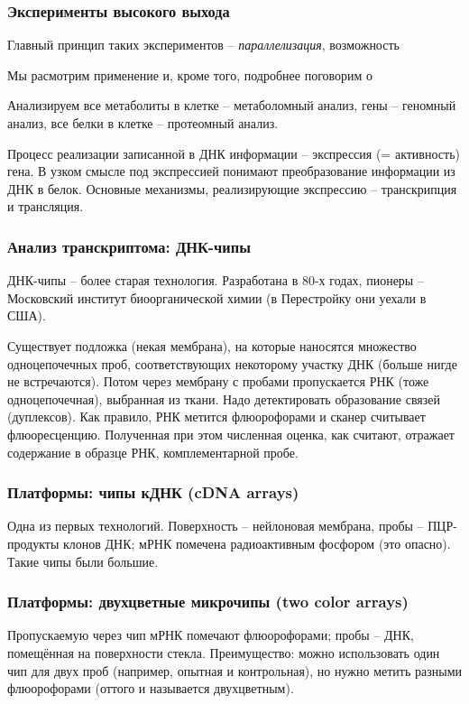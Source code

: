 \documentclass[main.tex]{subfiles}
\begin{document}
\subsubsection{Эксперименты высокого выхода}

Главный принцип таких экспериментов -- \emph{параллелизация}, возможность

Мы расмотрим применение и, кроме того, подробнее поговорим о %

Анализируем все метаболиты в клетке -- метаболомный анализ, гены -- геномный анализ, все белки в клетке -- протеомный анализ.

Процесс реализации записанной в ДНК информации -- экспрессия (= активность) гена. В узком смысле под экспрессией понимают преобразование информации из ДНК в белок. Основные механизмы, реализирующие экспрессию -- транскрипция и трансляция.

\subsubsection{Анализ транскриптома: ДНК-чипы}
ДНК-чипы -- более старая технология. Разработана в 80-х годах, пионеры -- Московский институт биоорганической химии (в Перестройку они уехали в США).

Существует подложка (некая мембрана), на которые наносятся множество одноцепочечных проб, соответствующих некоторому участку ДНК (больше нигде не встречаются).
Потом через мембрану с пробами пропускается РНК (тоже одноцепочечная), выбранная из ткани.
Надо детектировать образование связей (дуплексов).
Как правило, РНК метится флюорофорами и сканер считывает флюоресценцию.
Полученная при этом численная оценка, как считают, отражает содержание в образце РНК, комплементарной пробе.

\subsubsection{Платформы: чипы кДНК (cDNA arrays)}
Одна из первых технологий. Поверхность -- нейлоновая мембрана, пробы -- ПЦР-продукты клонов ДНК; мРНК помечена радиоактивным фосфором (это опасно). Такие чипы были большие.

\subsubsection{Платформы: двухцветные микрочипы (two color arrays)}

Пропускаемую через чип мРНК помечают флюорофорами; пробы -- ДНК, помещённая на поверхности стекла.
Преимущество: можно использовать один чип для двух проб (например, опытная и контрольная), но нужно метить разными флюорофорами (оттого и называется двухцветным).
\end{document}
